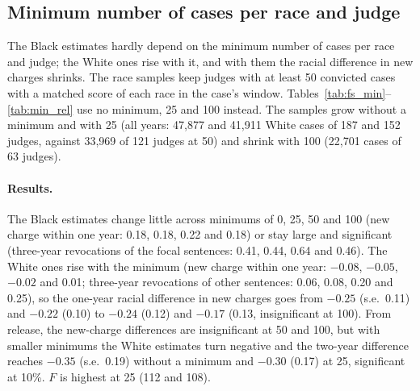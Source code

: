 \documentclass[11pt]{article}
\begin{document}
\subsection{Minimum number of cases per race and judge}\label{sec:mincases}

The Black estimates hardly depend on the minimum number of cases per race and judge; the White ones rise with it, and with them the racial difference in new charges shrinks. The race samples keep judges with at least 50 convicted cases with a matched score of each race in the case's window. Tables~\ref{tab:fs_min}--\ref{tab:min_rel} use no minimum, 25 and 100 instead. The samples grow without a minimum and with 25 (all years: 47,877 and 41,911 White cases of 187 and 152 judges, against 33,969 of 121 judges at 50) and shrink with 100 (22,701 cases of 63 judges).

\paragraph{Results.} The Black estimates change little across minimums of 0, 25, 50 and 100 (new charge within one year: 0.18, 0.18, 0.22 and 0.18) or stay large and significant (three-year revocations of the focal sentences: 0.41, 0.44, 0.64 and 0.46). The White ones rise with the minimum (new charge within one year: $-0.08$, $-0.05$, $-0.02$ and 0.01; three-year revocations of other sentences: 0.06, 0.08, 0.20 and 0.25), so the one-year racial difference in new charges goes from $-0.25$ (s.e.\ 0.11) and $-0.22$ (0.10) to $-0.24$ (0.12) and $-0.17$ (0.13, insignificant at 100). From release, the new-charge differences are insignificant at 50 and 100, but with smaller minimums the White estimates turn negative and the two-year difference reaches $-0.35$ (s.e.\ 0.19) without a minimum and $-0.30$ (0.17) at 25, significant at 10\%. $F$ is highest at 25 (112 and 108).
\end{document}
